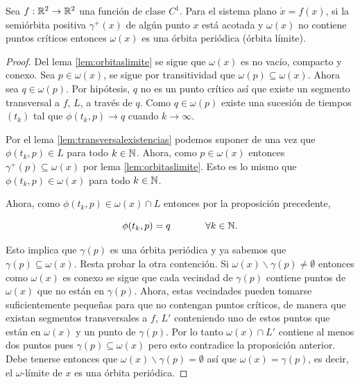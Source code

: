 \begin{theorem} \label{teo:poincarebendixson} Sea $f:{\mathbb{R}}^2 \to {\ensuremath{\mathbb{R}}}^2$ una función de clase $C^1$. Para el sistema plano $\dot{x} = f(x)$, si la semiórbita positiva $\gamma^+(x)$ de algún punto $x$ está acotada y $\omega(x)$ no contiene puntos críticos entonces $\omega(x)$ es una órbita periódica (órbita límite).
\end{theorem}

\begin{proof}
Del lema \ref{lem:orbitaslimite} se sigue que $\omega(x)$ es no vacío, compacto y conexo. Sea $p \in \omega(x)$, se sigue por transitividad que $\omega(p) \subseteq \omega(x)$. Ahora sea $q \in \omega(p)$. Por hipótesis, $q$ no es un punto crítico así que existe un segmento transversal a $f$, $L$, a través de $q$.  Como $q \in \omega(p)$ existe una sucesión de tiempos $(t_k)$ tal que $\phi(t_k, p) \to q$ cuando $k \to \infty$.

Por el lema \ref{lem:transversalexistencias} podemos suponer de una vez que $\phi(t_k, p) \in L$ para todo $k \in {\ensuremath{\mathbb{N}}}$. Ahora, como $p \in \omega(x)$ entonces $\gamma^+(p) \subseteq \omega(x)$ por lema \ref{lem:orbitaslimite}. Esto es lo mismo que $\phi(t_k, p) \in \omega(x)$ para todo $k \in {\ensuremath{\mathbb{N}}}$.

Ahora, como $\phi(t_k, p) \in \omega(x) \cap L$ entonces por la proposición precedente,

$$ \phi(t_k, p) = q  \hspace{0.5in} \forall k \in {\ensuremath{\mathbb{N}}}.$$

Esto implica que $\gamma(p)$ es una órbita periódica y ya sabemos que $\gamma(p) \subseteq \omega(x)$. Resta probar la otra contención.
Si $\omega(x) \backslash \gamma(p) \neq \emptyset$ entonces como $\omega(x)$ es conexo se sigue que cada vecindad de $\gamma(p)$ contiene puntos de $\omega(x)$ que no están en $\gamma(p)$.
Ahora, estas vecindades pueden tomarse suficientemente pequeñas para que no contengan puntos críticos, de manera que existan segmentos transversales a $f$, $L'$ conteniendo uno de estos puntos que están en $\omega(x)$ y un punto de $\gamma(p)$. Por lo tanto $\omega(x) \cap L'$ contiene al menos dos puntos pues $\gamma(p) \subseteq \omega(x)$ pero esto contradice la proposición anterior.
Debe tenerse entonces que $\omega(x) \backslash \gamma(p) = \emptyset$ así que $\omega(x) = \gamma(p)$, es decir, el $\omega$-límite de $x$ es una órbita periódica.

\end{proof}


